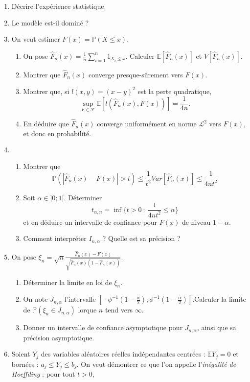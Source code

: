 \documentclass[a4paper]{article}
\begin{document}
\begin{enumerate}
\item Décrire l'expérience statistique.
\item Le modèle est-il dominé ?
\item On veut estimer $F(x)=\mathbb P(X\leq x)$.
	\begin{enumerate}
	\item On pose $\hat F_n(x)=\frac{1}{n}\sum_{i=1}^n 1_{X_i\leq x}$. Calculer $\mathbb E[\hat F_n(x)]$ et $V[\hat F_n(x)]$.
	\item Montrer que $\hat F_n(x)$ converge presque-sûrement vers $F(x)$.
	\item Montrer que, si $l(x,y)=(x-y)^2$ est la perte quadratique, \[\sup_{F\in \mathcal F} \mathbb E[l(\hat F_n(x),F(x))]=\frac{1}{4n}.\]
	\item En déduire que $\hat F_n(x)$ converge uniformément en norme $\mathcal L^2$ vers $F(x)$, et donc en probabilité.
	\end{enumerate}
\item \begin{enumerate}
	\item Montrer que \[\mathbb P(|\hat F_n(x) - F(x)|>t)\leq \frac{1}{t^2}Var[\hat F_n (x)]\leq \frac{1}{4nt^2}\]
	\item Soit $\alpha\in ]0;1[$. Déterminer 
	\[t_{\alpha,n}=\inf \{t>0 \ : \ \frac{1}{4nt^2}\leq \alpha\}\]
	et en déduire un intervalle de confiance pour $F(x)$ de niveau $1-\alpha$.
	\item Comment interpréter $I_{n,\alpha}$ ? Quelle est sa précision ?
	\end{enumerate}
\item On pose $\xi_n = \sqrt{n}\frac{\hat F_n(x) - F(x)}{\sqrt{\hat F_n(x)(1-\hat F_n(x))}}$.
	\begin{enumerate}
	\item Déterminer la limite en loi de $\xi_n$.
	\item On note $J_{n,\alpha}$ l'intervalle $[-\phi^{-1}(1-\frac{\alpha}{2});\phi^{-1}(1-\frac{\alpha}{2})]$.Calculer la limite de $\mathbb P(\xi_n\in J_{n,\alpha})$ lorque $n$ tend vers $\infty$.
	\item Donner un intervalle de confiance asymptotique pour $J_{n,\alpha}$, ainsi que sa précision asymptotique.
	\end{enumerate}
\item Soient $Y_j$ des variables aléatoires réelles indépendantes centrées : $\mathbb E Y_j = 0 $ et bornées : $a_j \leq Y_j \leq b_j$. On veut démontrer ce que l'on appelle l'\textit{inégalité de Hoeffding} : pour tout $t>0$, 

\end{enumerate}
\end{document}
